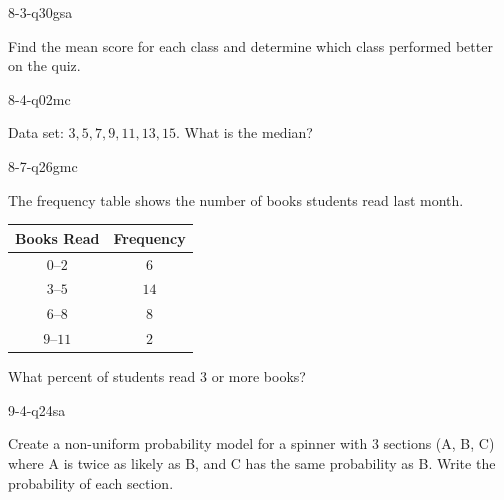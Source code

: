 \begin{practiceQuestion}{8-3-q30}{gsa}
\begin{questionText}
Find the mean score for each class and determine which class performed better on the quiz.
\end{questionText}
\end{practiceQuestion}

\begin{practiceQuestion}{8-4-q02}{mc}
\begin{questionText}
Data set: $3, 5, 7, 9, 11, 13, 15$. What is the median?
\end{questionText}
\end{practiceQuestion}

\begin{practiceQuestion}{8-7-q26}{gmc}
\begin{questionText}
The frequency table shows the number of books students read last month.

\begin{center}
\begin{tabular}{|c|c|}
\hline
\textbf{Books Read} & \textbf{Frequency} \\
\hline
$0$--$2$ & $6$ \\
\hline
$3$--$5$ & $14$ \\
\hline
$6$--$8$ & $8$ \\
\hline
$9$--$11$ & $2$ \\
\hline
\end{tabular}
\end{center}

What percent of students read $3$ or more books?
\end{questionText}
\end{practiceQuestion}

\begin{practiceQuestion}{9-4-q24}{sa}
\begin{questionText}
Create a non-uniform probability model for a spinner with $3$ sections (A, B, C) where A is twice as likely as B, and C has the same probability as B. Write the probability of each section.
\end{questionText}
\end{practiceQuestion}

